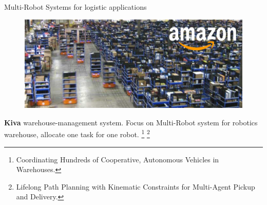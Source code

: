     \begin{frame}[fragile]{Multi-Robot Systems for logistic applications}

        \begin{figure}[hbt]
            \centering
            \includegraphics[width=\textwidth]{img/kiva.png}
        \end{figure}
        
        
    {\bf Kiva} warehouse-management system. 
    Focus on Multi-Robot system for robotics warehouse, allocate one task for one robot.
    {\let\thefootnote\relax\footnote{{Coordinating Hundreds of
    Cooperative, Autonomous
    Vehicles in Warehouses.}}}
    {\let\thefootnote\relax\footnote{{Lifelong Path Planning with Kinematic Constraints
    for Multi-Agent Pickup and Delivery.}}}
    \end{frame}


